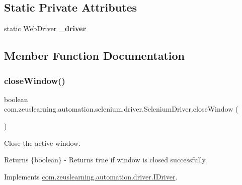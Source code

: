 \subsection*{Static Private Attributes}
\begin{DoxyCompactItemize}
\item 
\hypertarget{classcom_1_1zeuslearning_1_1automation_1_1selenium_1_1driver_1_1SeleniumDriver_abf3b2b8766f0fce805e3879e1bf97610}{}\label{classcom_1_1zeuslearning_1_1automation_1_1selenium_1_1driver_1_1SeleniumDriver_abf3b2b8766f0fce805e3879e1bf97610} 
static Web\+Driver {\bfseries \+\_\+driver}
\end{DoxyCompactItemize}


\subsection{Member Function Documentation}
\hypertarget{classcom_1_1zeuslearning_1_1automation_1_1selenium_1_1driver_1_1SeleniumDriver_a941fab966021a5f1c9b33544fc430b29}{}\label{classcom_1_1zeuslearning_1_1automation_1_1selenium_1_1driver_1_1SeleniumDriver_a941fab966021a5f1c9b33544fc430b29} 
\subsubsection{\texorpdfstring{close\+Window()}{closeWindow()}}
{\footnotesize\ttfamily boolean com.\+zeuslearning.\+automation.\+selenium.\+driver.\+Selenium\+Driver.\+close\+Window (\begin{DoxyParamCaption}{ }\end{DoxyParamCaption})\hspace{0.3cm}{\ttfamily [inline]}}

Close the active window.

\begin{DoxyReturn}{Returns}
\{boolean\} -\/ Returns {\ttfamily true} if window is closed successfully. 
\end{DoxyReturn}


Implements \hyperlink{interfacecom_1_1zeuslearning_1_1automation_1_1driver_1_1IDriver_a1efada042eeea9713b798f713bfad650}{com.\+zeuslearning.\+automation.\+driver.\+I\+Driver}.

